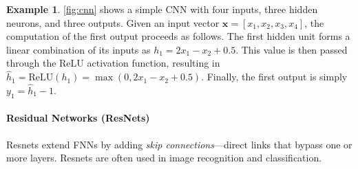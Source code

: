\documentclass[oneside,11pt,dvipsnames]{book}
\numberwithin{equation}{section}
\theoremstyle{definition}
\newtheorem{example}{Example}[section]
\theoremstyle{remark}
\begin{document}
\begin{example}
    \autoref{fig:cnn} shows a simple CNN with four inputs, three hidden neurons, and three outputs. %
Given an input vector $\mathbf{x} = [x_1, x_2, x_3, x_4]$, the computation of the first output proceeds as follows. 
The first hidden unit forms a linear combination of its inputs as $h_1 = 2x_1 - x_2 + 0.5$. 
This value is then passed through the ReLU activation function, resulting in $\hat{h}_1 = \mathrm{ReLU}(h_1) = \max(0, 2x_1 - x_2 + 0.5)$. 
Finally, the first output is simply $y_1 = \hat{h}_1 - 1$.


\end{example}

\paragraph{Residual Networks (ResNets)} Resnets extend FNNs by adding \emph{skip connections}—direct links that bypass one or more layers. Resnets are often used in image recognition and classification. 
\end{document}
